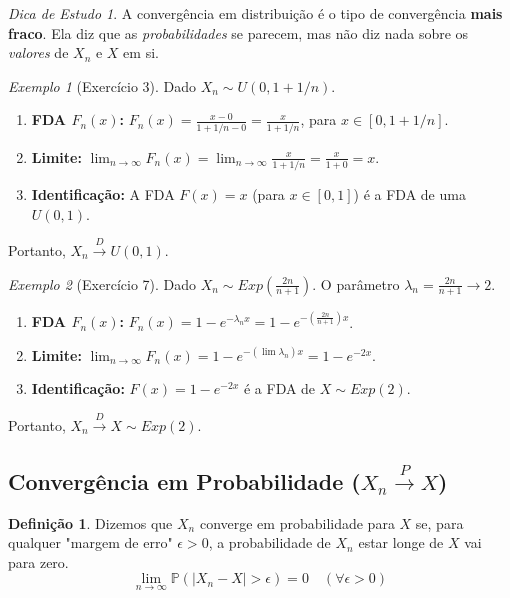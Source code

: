 \documentclass[a4paper, 10pt]{article} %
\theoremstyle{definition}
\newtheorem{definition}{Definição}[section] %
\theoremstyle{plain}
\theoremstyle{remark}
\newtheorem{example}{Exemplo}[section]
\newtheorem*{tip}{Dica de Estudo} %
\newcommand{\Prob}{\mathbb{P}}
\newcommand{\pto}{\xrightarrow{P}}      %
\newcommand{\dto}{\xrightarrow{D}}      %
\begin{document}
\begin{tip}
    A convergência em distribuição é o tipo de convergência \textbf{mais fraco}. Ela diz que as \textit{probabilidades} se parecem, mas não diz nada sobre os \textit{valores} de $X_n$ e $X$ em si.
\end{tip}

\begin{example}[Exercício 3]
    Dado $X_n \sim U(0, 1 + 1/n)$.
    \begin{enumerate}
        \item \textbf{FDA $F_n(x)$:} $F_n(x) = \frac{x - 0}{1 + 1/n - 0} = \frac{x}{1 + 1/n}$, para $x \in [0, 1+1/n]$.
        \item \textbf{Limite:} $\lim_{n \to \infty} F_n(x) = \lim_{n \to \infty} \frac{x}{1 + 1/n} = \frac{x}{1+0} = x$.
        \item \textbf{Identificação:} A FDA $F(x) = x$ (para $x \in [0,1]$) é a FDA de uma $U(0, 1)$.
    \end{enumerate}
    Portanto, $X_n \dto U(0, 1)$.
\end{example}

\begin{example}[Exercício 7]
    Dado $X_n \sim Exp(\frac{2n}{n+1})$. O parâmetro $\lambda_n = \frac{2n}{n+1} \to 2$.
    \begin{enumerate}
        \item \textbf{FDA $F_n(x)$:} $F_n(x) = 1 - e^{-\lambda_n x} = 1 - e^{-(\frac{2n}{n+1})x}$.
        \item \textbf{Limite:} $\lim_{n \to \infty} F_n(x) = 1 - e^{-(\lim \lambda_n)x} = 1 - e^{-2x}$.
        \item \textbf{Identificação:} $F(x) = 1 - e^{-2x}$ é a FDA de $X \sim Exp(2)$.
    \end{enumerate}
    Portanto, $X_n \dto X \sim Exp(2)$.
\end{example}

\subsection{Convergência em Probabilidade (\texorpdfstring{$X_n \pto X$}{X\_n -> P X})}
\label{sec:conv_prob}

\begin{definition}
Dizemos que $X_n$ converge em probabilidade para $X$ se, para qualquer "margem de erro" $\epsilon > 0$, a probabilidade de $X_n$ estar longe de $X$ vai para zero.
$$ \lim_{n \to \infty} \Prob(|X_n - X| > \epsilon) = 0 \quad (\forall \epsilon > 0) $$
\end{definition}
\end{document}
